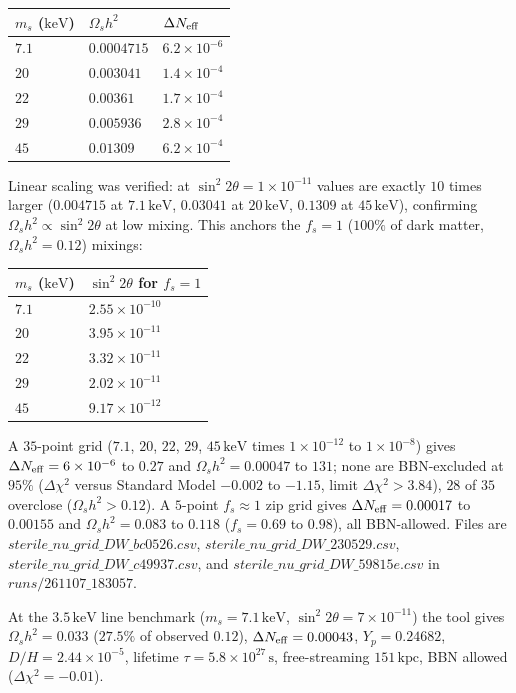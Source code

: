 \documentclass[11pt,a4paper]{article}
\begin{document}
\begin{longtable}{@{}p{}p{}p{}@{}}
\toprule
\textbf{$m_s$ ($\mathrm{keV}$)} & \textbf{$\Omega_s h^2$} & \textbf{$\Delta N_{\rm eff}$} \\ \midrule \endhead
$7.1$ & $0.0004715$ & $6.2\times10^{-6}$ \\
$20$ & $0.003041$ & $1.4\times10^{-4}$ \\
$22$ & $0.00361$ & $1.7\times10^{-4}$ \\
$29$ & $0.005936$ & $2.8\times10^{-4}$ \\
$45$ & $0.01309$ & $6.2\times10^{-4}$ \\
\bottomrule\end{longtable}
Linear scaling was verified: at $\sin^2 2\theta = 1\times10^{-11}$ values are exactly $10$ times larger ($0.004715$ at $7.1\,\mathrm{keV}$, $0.03041$ at $20\,\mathrm{keV}$, $0.1309$ at $45\,\mathrm{keV}$), confirming $\Omega_s h^2 \propto \sin^2 2\theta$ at low mixing. This anchors the $f_s = 1$ ($100\%$ of dark matter, $\Omega_s h^2 = 0.12$) mixings:

\begin{longtable}{@{}p{}p{}@{}}
\toprule
\textbf{$m_s$ ($\mathrm{keV}$)} & \textbf{$\sin^2 2\theta$ for $f_s=1$} \\ \midrule \endhead
$7.1$ & $2.55\times10^{-10}$ \\
$20$ & $3.95\times10^{-11}$ \\
$22$ & $3.32\times10^{-11}$ \\
$29$ & $2.02\times10^{-11}$ \\
$45$ & $9.17\times10^{-12}$ \\
\bottomrule\end{longtable}
A $35$-point grid ($7.1$, $20$, $22$, $29$, $45\,\mathrm{keV}$ times $1\times10^{-12}$ to $1\times10^{-8}$) gives $\Delta N_{\rm eff} = 6\times10^{-6}$ to $0.27$ and $\Omega_s h^2 = 0.00047$ to $131$; none are BBN-excluded at $95\%$ ($\Delta\chi^2$ versus Standard Model $-0.002$ to $-1.15$, limit $\Delta\chi^2 > 3.84$), $28$ of $35$ overclose ($\Omega_s h^2 > 0.12$). A $5$-point $f_s \approx 1$ zip grid gives $\Delta N_{\rm eff} = 0.00017$ to $0.00155$ and $\Omega_s h^2 = 0.083$ to $0.118$ ($f_s = 0.69$ to $0.98$), all BBN-allowed. Files are $sterile\_nu\_grid\_DW\_bc0526.csv$, $sterile\_nu\_grid\_DW\_230529.csv$, $sterile\_nu\_grid\_DW\_c49937.csv$, and $sterile\_nu\_grid\_DW\_59815e.csv$ in $runs/261107\_183057$.

At the $3.5\,\mathrm{keV}$ line benchmark ($m_s = 7.1\,\mathrm{keV}$, $\sin^2 2\theta = 7\times10^{-11}$) the tool gives $\Omega_s h^2 = 0.033$ ($27.5\%$ of observed $0.12$), $\Delta N_{\rm eff} = 0.00043$, $Y_p = 0.24682$, $D/H = 2.44\times10^{-5}$, lifetime $\tau = 5.8\times10^{27}\,\mathrm{s}$, free-streaming $151\,\mathrm{kpc}$, BBN allowed ($\Delta\chi^2 = -0.01$).
\end{document}
